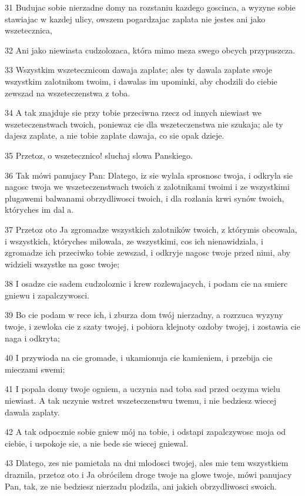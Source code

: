 \par 31 Budujac sobie nierzadne domy na rozstaniu kazdego goscinca, a wyzyne sobie stawiajac w kazdej ulicy, owszem pogardzajac zaplata nie jestes ani jako wszetecznica,
\par 32 Ani jako niewiasta cudzolozaca, która mimo meza swego obcych przypuszcza.
\par 33 Wszystkim wszetecznicom dawaja zaplate; ales ty dawala zaplate swoje wszystkim zalotnikom twoim, i dawalas im upominki, aby chodzili do ciebie zewszad na wszeteczenstwa z toba.
\par 34 A tak znajduje sie przy tobie przeciwna rzecz od innych niewiast we wszeteczenstwach twoich, poniewaz cie dla wszeteczenstwa nie szukaja; ale ty dajesz zaplate, a nie tobie zaplate dawaja, co sie opak dzieje.
\par 35 Przetoz, o wszetecznico! sluchaj slowa Panskiego.
\par 36 Tak mówi panujacy Pan: Dlatego, iz sie wylala sprosnosc twoja, i odkryla sie nagosc twoja we wszeteczenstwach twoich z zalotnikami twoimi i ze wszystkimi plugawemi balwanami obrzydliwosci twoich, i dla rozlania krwi synów twoich, któryches im dal a.
\par 37 Przetoz oto Ja zgromadze wszystkich zalotników twoich, z którymis obcowala, i wszystkich, któryches milowala, ze wszystkimi, cos ich nienawidziala, i zgromadze ich przeciwko tobie zewszad, i odkryje nagosc twoje przed nimi, aby widzieli wszystke na gosc twoje;
\par 38 I osadze cie sadem cudzoloznic i krew rozlewajacych, i podam cie na smierc gniewu i zapalczywosci.
\par 39 Bo cie podam w rece ich, i zburza dom twój nierzadny, a rozrzuca wyzyny twoje, i zewloka cie z szaty twojej, i pobiora klejnoty ozdoby twojej, i zostawia cie naga i odkryta;
\par 40 I przywioda na cie gromade, i ukamionuja cie kamieniem, i przebija cie mieczami swemi;
\par 41 I popala domy twoje ogniem, a uczynia nad toba sad przed oczyma wielu niewiast. A tak uczynie wstret wszeteczenstwu twemu, i nie bedziesz wiecej dawala zaplaty.
\par 42 A tak odpocznie sobie gniew mój na tobie, i odstapi zapalczywosc moja od ciebie, i uspokoje sie, a nie bede sie wiecej gniewal.
\par 43 Dlatego, zes nie pamietala na dni mlodosci twojej, ales mie tem wszystkiem draznila, przetoz oto i Ja obrócilem droge twoje na glowe twoje, mówi panujacy Pan, tak, ze nie bedziesz nierzadu plodzila, ani jakich obrzydliwosci swoich.
